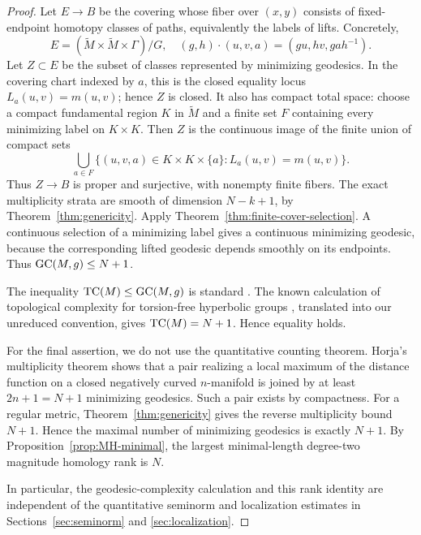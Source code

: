 \begin{proof}
Let $E\to B$ be the covering whose fiber
over $(x,y)$ consists of fixed-endpoint
homotopy classes of paths, equivalently
the labels of lifts. Concretely,
\[
 E=(\widetilde M\times\widetilde M
          \times\Gamma)/G,
 \quad
 (g,h)\cdot(u,v,a)=(gu,hv,gah^{-1}).
\]
Let $Z\subset E$ be the subset of classes
represented by minimizing geodesics.
In the covering chart indexed by $a$,
this is the closed equality locus
$L_a(u,v)=m(u,v)$; hence $Z$ is closed.
It also has compact total space: choose
a compact fundamental region $K$ in
$\widetilde M$ and a finite set $F$
containing every minimizing label on
$K\times K$. Then $Z$ is the continuous
image of the finite union of compact
sets
\[
 \bigcup_{a\in F}
 \{(u,v,a)\in K\times K\times\{a\}:
                            L_a(u,v)=m(u,v)\}.
\]
Thus $Z\to B$ is proper and surjective,
with nonempty finite fibers.
The exact multiplicity strata are smooth
of dimension $N-k+1$, by
Theorem~\ref{thm:genericity}.
Apply Theorem~\ref{thm:finite-cover-selection}. A continuous
selection of a minimizing label gives a
continuous minimizing geodesic, because
the corresponding lifted geodesic depends
smoothly on its endpoints. Thus
$\text{GC}(M,g)\leq N+1$.

The inequality $\text{TC}(M)\leq\text{GC}(M,g)$ is
standard \cite{RecioMitter2021}. The
known calculation of topological complexity
for torsion-free hyperbolic groups
\cite{Dranishnikov2020}, translated into
our unreduced convention, gives
$\text{TC}(M)=N+1$. Hence equality holds.

For the final assertion, we do not use the
quantitative counting theorem. Horja's
multiplicity theorem \cite{Horja1997}
shows that a pair realizing a local maximum
of the distance function on a closed
negatively curved $n$-manifold is joined
by at least $2n+1=N+1$ minimizing
geodesics. Such a pair exists by compactness.
For a regular metric, Theorem~\ref{thm:genericity}
gives the reverse multiplicity bound $N+1$.
Hence the maximal number of minimizing
geodesics is exactly $N+1$. By
Proposition~\ref{prop:MH-minimal}, the
largest minimal-length degree-two magnitude
homology rank is $N$.

In particular, the geodesic-complexity
calculation and this rank identity are
independent of the quantitative seminorm
and localization estimates in
Sections~\ref{sec:seminorm} and
\ref{sec:localization}.
\end{proof}
